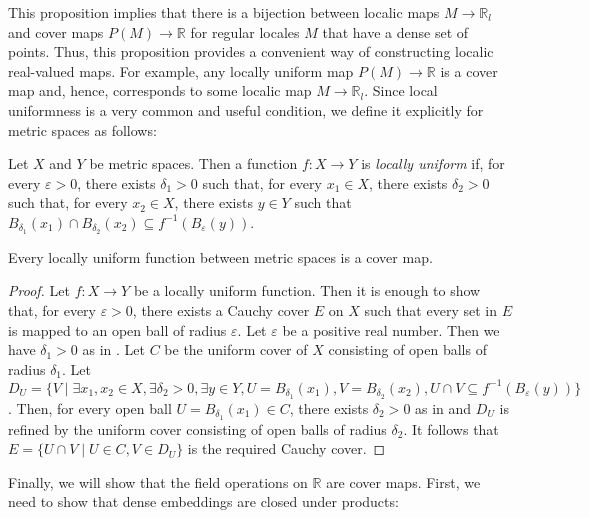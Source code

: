 \documentclass[reqno]{amsart}
\theoremstyle{definition}
\theoremstyle{remark}
\numberwithin{figure}{section}
\begin{document}
This proposition implies that there is a bijection between localic maps $M \to \mathbb{R}_l$ and cover maps $P(M) \to \mathbb{R}$ for regular locales $M$ that have a dense set of points.
Thus, this proposition provides a convenient way of constructing localic real-valued maps.
For example, any locally uniform map $P(M) \to \mathbb{R}$ is a cover map and, hence, corresponds to some localic map $M \to \mathbb{R}_l$.
Since local uniformness is a very common and useful condition, we define it explicitly for metric spaces as follows:

\begin{defn}
Let $X$ and $Y$ be metric spaces.
Then a function $f : X \to Y$ is \emph{locally uniform} if, for every $\varepsilon > 0$, there exists $\delta_1 > 0$ such that,
for every $x_1 \in X$, there exists $\delta_2 > 0$ such that, for every $x_2 \in X$, there exists $y \in Y$ such that $B_{\delta_1}(x_1) \cap B_{\delta_2}(x_2) \subseteq f^{-1}(B_\varepsilon(y))$.
\end{defn}

\begin{prop}
Every locally uniform function between metric spaces is a cover map.
\end{prop}
\begin{proof}
Let $f : X \to Y$ be a locally uniform function.
Then it is enough to show that, for every $\varepsilon > 0$, there exists a Cauchy cover $E$ on $X$ such that every set in $E$ is mapped to an open ball of radius $\varepsilon$.
Let $\varepsilon$ be a positive real number.
Then we have $\delta_1 > 0$ as in .
Let $C$ be the uniform cover of $X$ consisting of open balls of radius $\delta_1$.
Let $D_U = \{ V \mid \exists x_1,x_2 \in X, \exists \delta_2 > 0, \exists y \in Y, U = B_{\delta_1}(x_1), V = B_{\delta_2}(x_2), U \cap V \subseteq f^{-1}(B_\varepsilon(y)) \}$.
Then, for every open ball $U = B_{\delta_1}(x_1) \in C$, there exists $\delta_2 > 0$ as in  and $D_U$ is refined by the uniform cover consisting of open balls of radius $\delta_2$.
It follows that $E = \{ U \cap V \mid U \in C, V \in D_U \}$ is the required Cauchy cover.
\end{proof}

Finally, we will show that the field operations on $\mathbb{R}$ are cover maps.
First, we need to show that dense embeddings are closed under products:
\end{document}
